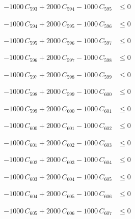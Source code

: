 \documentclass[a4paper,11pt]{article}
\begin{document}
\begin{align}
-1000\,C_{593} + 2000\,C_{594} - 1000\,C_{595} &\leq 0 \nonumber
\end{align}

\begin{align}
-1000\,C_{594} + 2000\,C_{595} - 1000\,C_{596} &\leq 0 \nonumber
\end{align}

\begin{align}
-1000\,C_{595} + 2000\,C_{596} - 1000\,C_{597} &\leq 0 \nonumber
\end{align}

\begin{align}
-1000\,C_{596} + 2000\,C_{597} - 1000\,C_{598} &\leq 0 \nonumber
\end{align}

\begin{align}
-1000\,C_{597} + 2000\,C_{598} - 1000\,C_{599} &\leq 0 \nonumber
\end{align}

\begin{align}
-1000\,C_{598} + 2000\,C_{599} - 1000\,C_{600} &\leq 0 \nonumber
\end{align}

\begin{align}
-1000\,C_{599} + 2000\,C_{600} - 1000\,C_{601} &\leq 0 \nonumber
\end{align}

\begin{align}
-1000\,C_{600} + 2000\,C_{601} - 1000\,C_{602} &\leq 0 \nonumber
\end{align}

\begin{align}
-1000\,C_{601} + 2000\,C_{602} - 1000\,C_{603} &\leq 0 \nonumber
\end{align}

\begin{align}
-1000\,C_{602} + 2000\,C_{603} - 1000\,C_{604} &\leq 0 \nonumber
\end{align}

\begin{align}
-1000\,C_{603} + 2000\,C_{604} - 1000\,C_{605} &\leq 0 \nonumber
\end{align}

\begin{align}
-1000\,C_{604} + 2000\,C_{605} - 1000\,C_{606} &\leq 0 \nonumber
\end{align}

\begin{align}
-1000\,C_{605} + 2000\,C_{606} - 1000\,C_{607} &\leq 0 \nonumber
\end{align}
\end{document}
